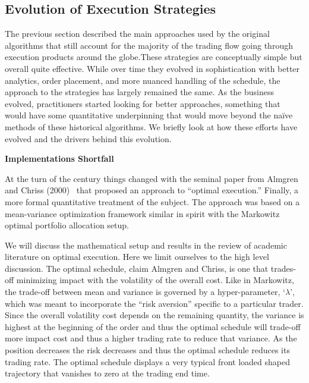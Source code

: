\subsection{Evolution of Execution Strategies}

The previous section described the main approaches used by the original algorithms that still account for the majority of the trading flow going through execution products around the globe.These strategies are conceptually simple but overall quite effective. While over time they evolved in sophistication with better analytics, order placement, and more nuanced handling of the schedule, the approach to the strategies has largely remained the same. As the business evolved, practitioners started looking for better approaches, something that would have some quantitative underpinning that would move beyond the na\"ive methods of these historical algorithms. We briefly look at how these efforts have evolved and the drivers behind this evolution. \twomedskip


\noindent\textbf{Implementations Shortfall} \twomedskip


At the turn of the century things changed with the seminal paper from Almgren and Chriss (2000)~\cite{alm2000} that proposed an approach to ``optimal execution.'' Finally, a more formal quantitative treatment of the subject. The approach was based on a  mean-variance optimization framework similar in spirit with the Markowitz optimal portfolio allocation setup.


We will discuss the  mathematical setup and results in the review of  academic literature on optimal execution. Here we limit ourselves to the high level discussion. The optimal schedule, claim Almgren and Chriss, is one that trades-off minimizing impact with the volatility of the overall cost. Like in Markowitz, the trade-off between mean and variance is governed by a hyper-parameter, `$\lambda$', which was meant to incorporate the ``risk aversion'' specific to a particular trader. Since the overall volatility cost depends on the remaining quantity, the variance is highest at the beginning of the order and thus the optimal schedule will trade-off more impact cost and thus a higher trading rate to reduce that variance. As the position decreases the risk decreases and thus the optimal schedule reduces its trading rate. The optimal schedule displays a very typical front loaded shaped trajectory that vanishes to zero at the trading end time.



